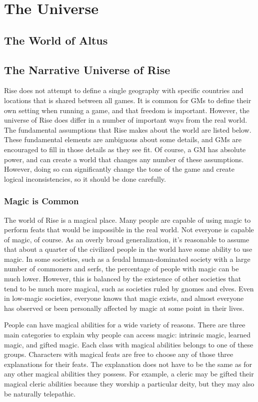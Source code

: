 \chapter{The Universe}

\section{The World of Altus}

\section{The Narrative Universe of Rise}
    Rise does not attempt to define a single geography with specific countries and locations that is shared between all games.
    It is common for GMs to define their own setting when running a game, and that freedom is important.
    However, the universe of Rise does differ in a number of important ways from the real world.
    The fundamental assumptions that Rise makes about the world are listed below.
    These fundamental elements are ambiguous about some details, and GMs are encouraged to fill in those details as they see fit.
    Of course, a GM has absolute power, and can create a world that changes any number of these assumptions.
    However, doing so can significantly change the tone of the game and create logical inconsistencies, so it should be done carefully.

    \subsection{Magic is Common}
        The world of Rise is a magical place.
        Many people are capable of using magic to perform feats that would be impossible in the real world.
        Not everyone is capable of magic, of course.
        As an overly broad generalization, it's reasonable to assume that about a quarter of the civilized people in the world have some ability to use magic.
        In some societies, such as a feudal human-dominated society with a large number of commoners and serfs, the percentage of people with magic can be much lower.
        However, this is balanced by the existence of other societies that tend to be much more magical, such as societies ruled by gnomes and elves.
        Even in low-magic societies, everyone knows that magic exists, and almost everyone has observed or been personally affected by magic at some point in their lives.

        People can have magical abilities for a wide variety of reasons.
        There are three main categories to explain why people can access magic: intrinsic magic, learned magic, and gifted magic.
        Each class with magical abilities belongs to one of these groups.
        Characters with magical feats are free to choose any of those three explanations for their feats.
        The explanation does not have to be the same as for any other magical abilities they possess.
        For example, a cleric may be gifted their magical cleric abilities because they worship a particular deity, but they may also be naturally telepathic.

